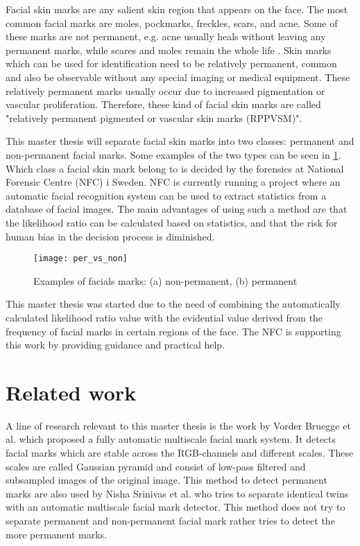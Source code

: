 Facial skin marks are any salient skin region that appears on the face. The most common facial marks are moles, pockmarks, freckles, scars, and acne. Some of these marks are not permanent, e.g. acne usually heals without leaving any permanent marks, while scares and moles remain the whole life \cite{automatic_detector_2015}. Skin marks which can be used for identification need to be relatively permanent, common and also be observable without any special imaging or medical equipment. These relatively permanent marks usually occur due to increased pigmentation or vascular proliferation. Therefore, these kind of facial skin marks are called "relatively permanent pigmented or vascular skin marks (RPPVSM)". \cite{statistic_RPPVSM} 

This master thesis will separate facial skin marks into two classes: permanent and non-permanent facial marks. Some examples of the two types can be seen in \cref{fig:per_vs_non}. Which class a facial skin mark belong to is decided by the forensics at National Forensic Centre (NFC) i Sweden. NFC is currently running a project where an automatic facial recognition system can be used to extract statistics from a database of facial images. The main advantages of using such a method are that the likelihood ratio can be calculated based on statistics, and that the risk for human bias in the decision process is diminished.

\FloatBarrier
\begin{figure}[h]
	\centering
	\texttt{[image: per\_vs\_non]}
	\caption{Examples of facials marks: (a) non-permanent, (b) permanent \label{fig:per_vs_non}}
\end{figure}
\FloatBarrier

This master thesis was started due to the need of combining the automatically calculated likelihood ratio value with the evidential value derived from the frequency of facial marks in certain regions of the face. The NFC is supporting this work by providing guidance and practical help.

\section{Related work}

A line of research relevant to this master thesis is the work by Vorder Bruegge et al. \cite{automatic_detector_2015} which proposed a fully automatic multiscale facial mark system. It detects facial marks which are stable across the RGB-channels and different scales. These scales are called Gaussian pyramid and consist of low-pass filtered and subsampled images of the original image. This method to detect permanent marks are also used by Nisha Srinivas et al. \cite{twins} who tries to separate identical twins with an automatic multiscale facial mark detector. This method does not try to separate permanent and non-permanent facial mark rather tries to detect the more permanent marks.  

